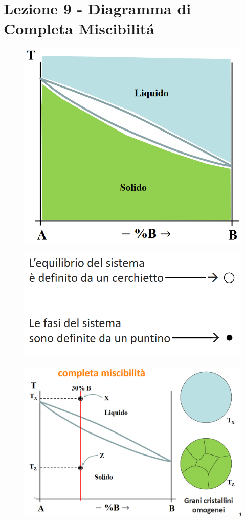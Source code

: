 \documentclass{article}
\begin{document}
{    \section{Lezione 9 - Diagramma di Completa Miscibilit\'a}
        \begin{figure}[!h]
            \centering
            \includegraphics[width=.85\linewidth]{Zone di stato in un diagramma di stato per due leghe compleamente miscibili - Parte 2.png}
        \end{figure}
        \begin{figure}[!h]
            \centering
            \includegraphics[width=.85\linewidth]{Indice delle indicazioni di sistema e fasi nei diagrammi di stato.png}
        \end{figure}
        \begin{figure}[!h]
            \centering
            \includegraphics[width=.85\linewidth]{Sistem 30pc B completamente miscibile.png}

\end{figure}}
\end{document}
